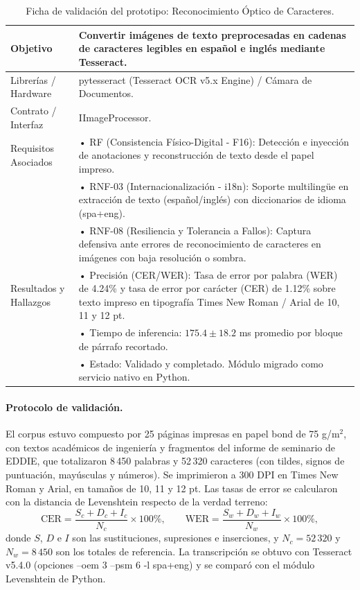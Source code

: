 \begin{table}[H]
    \centering
    \caption{Ficha de validación del prototipo: Reconocimiento Óptico de Caracteres.}
    \label{tab:ficha_f3}
    \begin{tabular}{L{3.2cm} L{11.0cm}}
        \toprule
        Objetivo & Convertir imágenes de texto preprocesadas en cadenas de caracteres legibles en español e inglés mediante Tesseract. \\ \midrule
        Librerías / Hardware & pytesseract (Tesseract OCR v5.x Engine) / Cámara de Documentos. \\ \midrule
        Contrato / Interfaz & IImageProcessor. \\ \midrule
        Requisitos Asociados &
        • RF (Consistencia Físico-Digital - F16): Detección e inyección de anotaciones y reconstrucción de texto desde el papel impreso. \vspace{0.1cm} \\
        & • RNF-03 (Internacionalización - i18n): Soporte multilingüe en extracción de texto (español/inglés) con diccionarios de idioma (spa+eng). \vspace{0.1cm} \\
        & • RNF-08 (Resiliencia y Tolerancia a Fallos): Captura defensiva ante errores de reconocimiento de caracteres en imágenes con baja resolución o sombra. \\ \midrule
        Resultados y Hallazgos &
        • Precisión (CER/WER): Tasa de error por palabra (WER) de 4.24\% y tasa de error por carácter (CER) de 1.12\% sobre texto impreso en tipografía Times New Roman / Arial de 10, 11 y 12 pt. \vspace{0.1cm} \\
        & • Tiempo de inferencia: $175.4 \pm 18.2$ ms promedio por bloque de párrafo recortado. \vspace{0.1cm} \\
        & • Estado: Validado y completado. Módulo migrado como servicio nativo en Python. \\ \bottomrule
    \end{tabular}
\end{table}
 
\paragraph{Protocolo de validación.} El corpus estuvo compuesto por 25 páginas impresas en papel bond de 75 g/m$^2$, con textos académicos de ingeniería y fragmentos del informe de seminario de EDDIE, que totalizaron 8\,450 palabras y 52\,320 caracteres (con tildes, signos de puntuación, mayúsculas y números). Se imprimieron a 300 DPI en Times New Roman y Arial, en tamaños de 10, 11 y 12 pt. Las tasas de error se calcularon con la distancia de Levenshtein respecto de la verdad terreno:
\[ \mathrm{CER} = \frac{S_c + D_c + I_c}{N_c} \times 100\%, \qquad \mathrm{WER} = \frac{S_w + D_w + I_w}{N_w} \times 100\%, \]
donde $S$, $D$ e $I$ son las sustituciones, supresiones e inserciones, y $N_c = 52\,320$ y $N_w = 8\,450$ son los totales de referencia. La transcripción se obtuvo con Tesseract v5.4.0 (opciones --oem 3 --psm 6 -l spa+eng) y se comparó con el módulo Levenshtein de Python.
 
